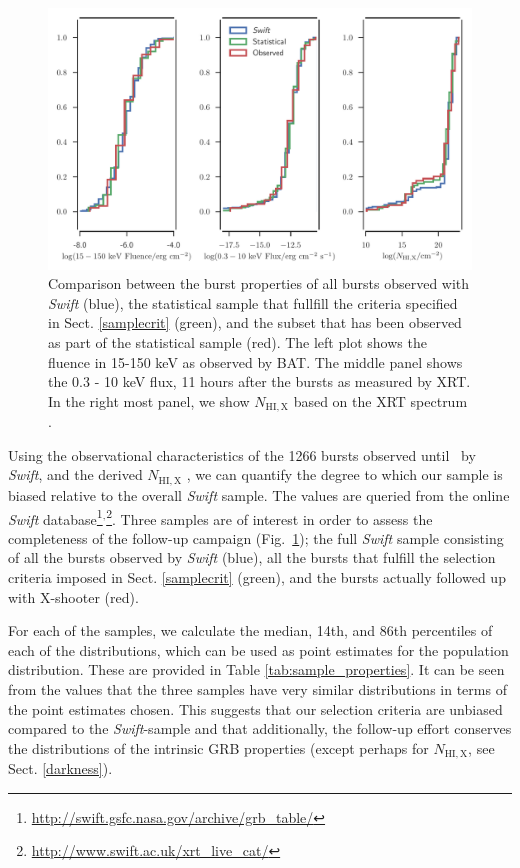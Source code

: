 \documentclass{aa}    %
\begin{document}
\begin{figure}
	\centerline{\includegraphics[width=18cm]{figures/completeness_BAT.pdf}}
\caption{Comparison between the burst properties of all bursts observed with
	\textit{Swift} (blue), the statistical sample that fullfill the criteria
	specified in Sect. \ref{samplecrit} (green), and the subset that has been
	observed as part of the statistical sample (red). The left plot shows the
	fluence in 15-150 keV as observed by BAT. The middle panel shows the 0.3 - 10
	keV flux, 11 hours after the bursts as measured by XRT. In the right most
	panel, we show $N_{\mathrm{HI,X}}$ based on the XRT spectrum
	\citep{Evans2009}.} \label{fig:swift_complete}
\end{figure}

Using the observational characteristics of the 1266 bursts observed until
\termdate~by \textit{Swift}, and the derived $N_{\mathrm{HI,X}}$
\citep{Evans2009}, we can quantify the degree to which our sample is biased
relative to the overall \textit{Swift} sample. The values are queried from the
online \textit{Swift}
database\footnote{\url{http://swift.gsfc.nasa.gov/archive/grb\_table/}}$^,$\footnote{\url{http://www.swift.ac.uk/xrt\_live\_cat/}}. Three samples are of interest in order to assess the completeness of the follow-up campaign (Fig.~\ref{fig:swift_complete}); the full \textit{Swift} sample consisting of all the bursts observed by \textit{Swift} (blue), all the bursts that fulfill the selection criteria imposed in Sect. \ref{samplecrit} (green), and the bursts actually followed up with X-shooter (red).



For each of the samples, we calculate the median, 14th, and 86th percentiles of
each of the distributions, which can be used as point estimates for the
population distribution. These are provided in Table
\ref{tab:sample_properties}. It can be seen from the values that the three
samples have very similar distributions in terms of the point estimates chosen.
This suggests that our selection criteria are unbiased compared to the
\textit{Swift}-sample and that additionally, the follow-up effort conserves the
distributions of the intrinsic GRB properties (except perhaps for
$N_{\mathrm{HI,X}}$, see Sect. \ref{darkness}).
\end{document}
